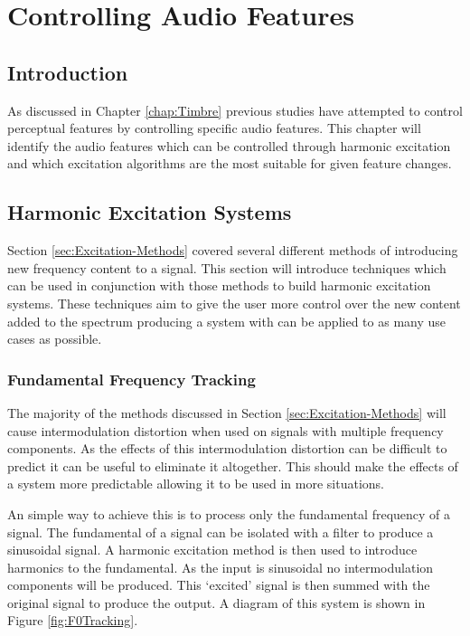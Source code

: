 
\chapter{Controlling Audio Features} %
\label{chap:FeatureControl}

\section{Introduction}
\label{sec:ExcitationSystems-Introduction}
	As discussed in Chapter \ref{chap:Timbre} previous studies have attempted to control perceptual features by 
	controlling specific audio features. This chapter will identify the audio features which can be controlled through 
	harmonic excitation and which excitation algorithms are the most suitable for given feature changes.

\section{Harmonic Excitation Systems}
\label{sec:Excitation-Systems}
	Section \ref{sec:Excitation-Methods} covered several different methods of introducing new frequency content to a
	signal. This section will introduce techniques which can be used in conjunction with those methods to build
	harmonic excitation systems. These techniques aim to give the user more control over the new content added to the
	spectrum producing a system with can be applied to as many use cases as possible.

	\subsection{Fundamental Frequency Tracking}
	\label{sec:Excitation-Fundamental}
		The majority of the methods discussed in Section \ref{sec:Excitation-Methods} will cause intermodulation
		distortion when used on signals with multiple frequency components. As the effects of this intermodulation
		distortion can be difficult to predict it can be useful to eliminate it altogether. This should make the
		effects of a system more predictable allowing it to be used in more situations.

		An simple way to achieve this is to process only the fundamental frequency of a signal. The fundamental of
		a signal can be isolated with a filter to produce a sinusoidal signal. A harmonic excitation method is then
		used to introduce harmonics to the fundamental. As the input is sinusoidal no intermodulation components
		will be produced. This `excited' signal is then summed with the original signal to produce the output. A
		diagram of this system is shown in Figure \ref{fig:F0Tracking}.

